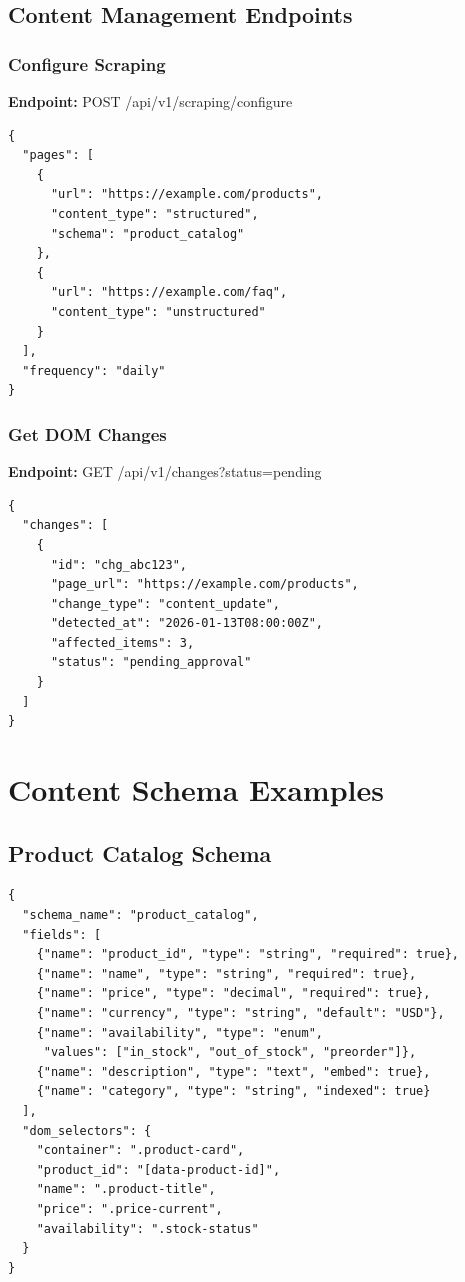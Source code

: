 \section{Content Management Endpoints}

\subsection{Configure Scraping}

\textbf{Endpoint:} POST /api/v1/scraping/configure

\begin{lstlisting}
{
  "pages": [
    {
      "url": "https://example.com/products",
      "content_type": "structured",
      "schema": "product_catalog"
    },
    {
      "url": "https://example.com/faq",
      "content_type": "unstructured"
    }
  ],
  "frequency": "daily"
}
\end{lstlisting}

\subsection{Get DOM Changes}

\textbf{Endpoint:} GET /api/v1/changes?status=pending

\begin{lstlisting}
{
  "changes": [
    {
      "id": "chg_abc123",
      "page_url": "https://example.com/products",
      "change_type": "content_update",
      "detected_at": "2026-01-13T08:00:00Z",
      "affected_items": 3,
      "status": "pending_approval"
    }
  ]
}
\end{lstlisting}

\chapter{Content Schema Examples}

\section{Product Catalog Schema}

\begin{lstlisting}
{
  "schema_name": "product_catalog",
  "fields": [
    {"name": "product_id", "type": "string", "required": true},
    {"name": "name", "type": "string", "required": true},
    {"name": "price", "type": "decimal", "required": true},
    {"name": "currency", "type": "string", "default": "USD"},
    {"name": "availability", "type": "enum", 
     "values": ["in_stock", "out_of_stock", "preorder"]},
    {"name": "description", "type": "text", "embed": true},
    {"name": "category", "type": "string", "indexed": true}
  ],
  "dom_selectors": {
    "container": ".product-card",
    "product_id": "[data-product-id]",
    "name": ".product-title",
    "price": ".price-current",
    "availability": ".stock-status"
  }
}
\end{lstlisting}

